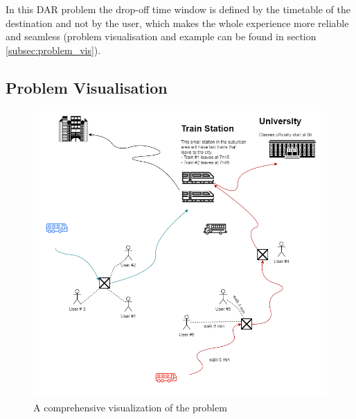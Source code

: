 \documentclass{article}
\begin{document}
In this DAR problem the drop-off time window is defined by the timetable of the destination and not by the user, which makes the whole experience more reliable and seamless (problem visualisation and example can be found in section \ref{subsec:problem_vis}). 


\subsection*{Problem Visualisation}
\label{subsec:problem_vis}

\begin{figure}[H]
\centering
\includegraphics[scale=0.4]{pictures/Display_problem}
\caption{A comprehensive visualization of the problem}
\label{fig:Diagram}
\end{figure}
\end{document}
